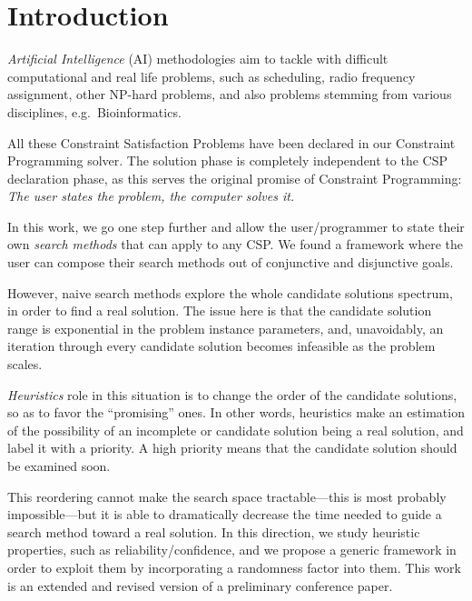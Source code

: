 \documentclass{ws-ijait}
\begin{document}


\section{Introduction}

\emph{Artificial Intelligence} (AI) methodologies aim to
tackle with difficult computational and real life problems,
such as scheduling,\cite{pinedo-scheduling} radio frequency
assignment,\cite{radio-link} other NP-hard problems, and
also problems stemming from various disciplines, e.g.\ 
Bioinformatics.\cite{bioinformatics}

All these Constraint Satisfaction Problems have been
declared in our Constraint Programming solver.\cite{Naxos}
The solution phase is completely independent to the CSP
declaration phase, as this serves the original promise of
Constraint Programming: \emph{The user states the problem,
the computer solves it.}\cite{grand-challenges}

In this work, we go one step further and allow the
user\slash programmer to state their own \emph{search
methods} that can apply to any CSP. We found a framework
where the user can compose their search methods out of
conjunctive and disjunctive goals.

However, naive search methods explore the whole candidate
solutions spectrum, in order to find a real solution. The
issue here is that the candidate solution range is
exponential in the problem instance parameters, and,
unavoidably, an iteration through every candidate solution
becomes infeasible as the problem scales.

\emph{Heuristics} role in this situation is to change the
order of the candidate solutions, so as to favor the
``promising'' ones. In other words, heuristics make an
estimation of the possibility of an incomplete or candidate
solution being a real solution, and label it with a
priority. A high priority means that the candidate solution
should be examined soon.

This reordering cannot make the search space
tractable---this is most probably
impossible\cite{p-np}---but it is able to dramatically
decrease the time needed to guide a search method toward a
real solution. In this direction, we study heuristic
properties, such as reliability\slash confidence, and we
propose a generic framework in order to exploit them by
incorporating a randomness factor into them. This work is an
extended and revised version of a preliminary conference
paper.\cite{Pothitos2016-PoPS}
\end{document}
